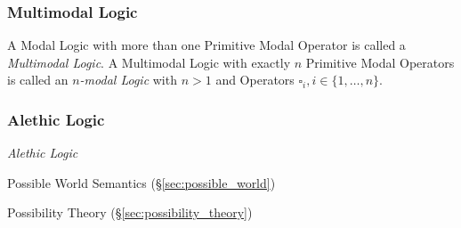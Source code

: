 \subsubsection{Multimodal Logic}\label{sec:multimodal_logic}

A Modal Logic with more than one Primitive Modal Operator is called a
\emph{Multimodal Logic}. A Multimodal Logic with exactly $n$ Primitive
Modal Operators is called an \emph{$n$-modal Logic} with $n > 1$ and
Operators $\square_i, i \in \{1, \ldots, n\}$.



\subsubsection{Alethic Logic}\label{sec:alethic_logic}

\emph{Alethic Logic}

Possible World Semantics (\S\ref{sec:possible_world})

Possibility Theory (\S\ref{sec:possibility_theory})

